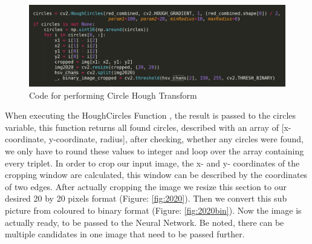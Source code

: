 \begin{figure}[H]
	\minipage{\textwidth}
	\includegraphics[width=\linewidth]{images/detectioncode.png}
	\caption{Code for performing Circle Hough Transform}\label{fig:detection_code}
	\endminipage\hfill
\end{figure}
When executing the HoughCircles Function \cite{houghcircles}, the result is passed to the circles variable, this function returns all found circles, described with an array of [x-coordinate, y-coordinate, radius],  after checking, whether any circles were found, we only have to round these values to integer and loop over the array containing every triplet. \newline
In order to crop our input image, the x- and y- coordinates of the cropping window are calculated, this window can be described by the coordinates of two edges. After actually cropping the image we resize this section to our desired 20 by 20 pixels format (Figure: \ref{fig:2020}). Then we convert this sub picture from coloured to binary format (Figure: \ref{fig:2020bin}). Now the image is actually ready, to be passed to the Neural Network. Be noted, there can be multiple candidates in one image that need to be passed further.   

